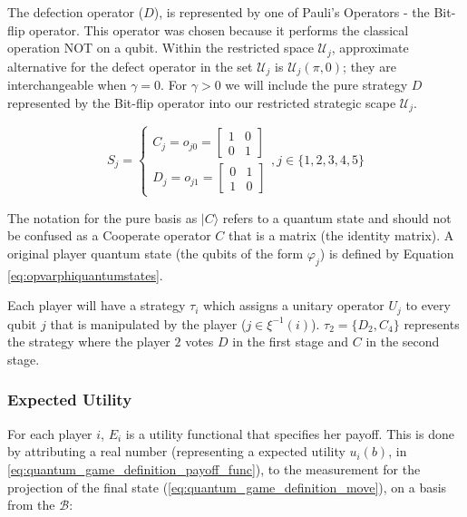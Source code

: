 \documentclass[10pt,twocolumn]{llncs}
\begin{document}
The defection operator ($D$), is represented by one of Pauli's Operators - the Bit-flip operator. This operator was chosen because it performs the classical operation NOT on a qubit. 
Within the restricted space $\mathcal{U}_{j}$, approximate alternative for the defect operator in the set $\mathcal{U}_{j}$ is $\mathcal{U}_{j}(\pi, 0)$; they are interchangeable when $\gamma = 0$. For $\gamma >0$ we will include the pure strategy $D$ represented by the Bit-flip operator into our restricted strategic scape $\mathcal{U}_{j}$.



\begin{equation}
S_{j} = \begin{cases}
C_{j} = o_{j0}=\left[\begin{array}{cc}
1 & 0\\
0 & 1
\end{array}\right]\\
D_{j} = o_{j1}=\left[\begin{array}{cc}
0 & 1\\
1 & 0
\end{array}\right]
\end{cases} , j \in \{ 1, 2, 3, 4, 5 \}
\label{eq:operators_piratas_quanticos}
\end{equation}



The notation for the pure basis as $\vert C\rangle$ refers to a quantum state and should not be confused as a Cooperate operator $C$ that is a matrix (the identity matrix). A original player quantum state (the qubits of the form $\varphi_{j}$) is defined by Equation \eqref{eq:opvarphiquantumstates}.


Each player will have a strategy $\tau_{i}$  which assigns a
unitary operator $U_{j}$ to every qubit $j$ that is manipulated
by the player ($j$$\in\xi^{-1}(i)$). $\tau_{2}= \{D_{2},C_{4}\}$ represents the strategy where the player $2$ votes $D$ in the first stage and $C$ in the second stage.




\subsubsection{Expected Utility}
\label{subsec:pirates_utility}

 For each player $i$, $E_{i}$ is a utility functional that
specifies her payoff. This is done by attributing a real number (representing a expected utility $ u_{i}(b)$, in \eqref{eq:quantum_game_definition_payoff_func}), to the measurement for the projection of the final state (\eqref{eq:quantum_game_definition_move}), on a basis from the $\mathcal{B}$:
\end{document}
